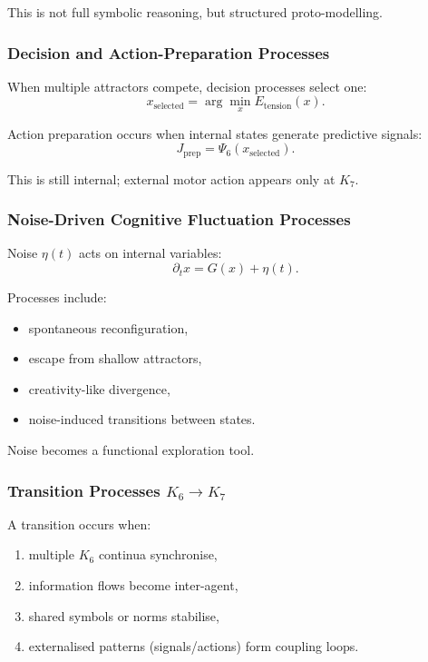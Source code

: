 This is not full symbolic reasoning, but structured proto-modelling.

\subsubsection{Decision and Action-Preparation Processes}

When multiple attractors compete, decision processes select one:
\[
x_{\text{selected}} =
\arg\min_x E_{\text{tension}}(x).
\]

Action preparation occurs when internal states generate predictive
signals:
\[
J_{\text{prep}} = \Psi_6(x_{\text{selected}}).
\]

This is still internal; external motor action appears only at $K_7$.

\subsubsection{Noise-Driven Cognitive Fluctuation Processes}

Noise $\eta(t)$ acts on internal variables:
\[
\partial_t x = G(x) + \eta(t).
\]

Processes include:
\begin{itemize}
    \item spontaneous reconfiguration,
    \item escape from shallow attractors,
    \item creativity-like divergence,
    \item noise-induced transitions between states.
\end{itemize}

Noise becomes a functional exploration tool.

\subsubsection{Transition Processes \texorpdfstring{$K_6 \to K_7$}{K_6 \to K_7}}

A transition occurs when:
\begin{enumerate}
    \item multiple $K_6$ continua synchronise,
    \item information flows become inter-agent,
    \item shared symbols or norms stabilise,
    \item externalised patterns (signals/actions) form coupling loops.
\end{enumerate}

